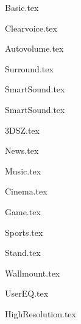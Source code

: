 {Basic.tex}

{Clearvoice.tex}

{Autovolume.tex}

{Surround.tex}

{SmartSound.tex}

{SmartSound.tex}

{3DSZ.tex}

{News.tex}

{Music.tex}

{Cinema.tex}

{Game.tex}

{Sports.tex}

{Stand.tex}

{Wallmount.tex}

{UserEQ.tex}

{HighResolution.tex}